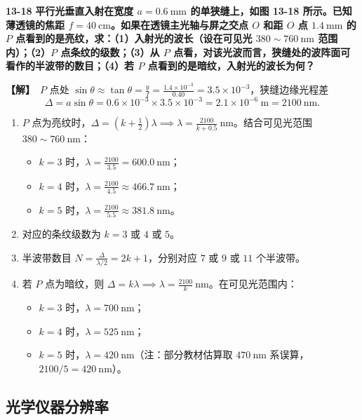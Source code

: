 \documentclass[zihao=5,a4paper,UTF8]{ctexart}
\newenvironment{prob}[2]{%
    \par\vspace{6pt}\noindent\textbf{\color{navy}#1} \textbf{#2}\par\nopagebreak\vspace{2pt}%
}{%
    \par\vspace{4pt}%
}
\newcommand{\sol}{\noindent\textbf{\color{tealaccent}【解】}\ }
\begin{document}
\begin{prob}{13-18}{平行光垂直入射在宽度 $a=0.6\ \mathrm{mm}$ 的单狭缝上，如图 13-18 所示。已知薄透镜的焦距 $f=40\ \mathrm{cm}$。如果在透镜主光轴与屏之交点 $O$ 和距 $O$ 点 $1.4\ \mathrm{mm}$ 的 $P$ 点看到的是亮纹，求：（1）入射光的波长（设在可见光 $380\sim 760\ \mathrm{nm}$ 范围内）；（2）$P$ 点条纹的级数；（3）从 $P$ 点看，对该光波而言，狭缝处的波阵面可看作的半波带的数目；（4）若 $P$ 点看到的是暗纹，入射光的波长为何？}
\sol $P$ 点处 $\sin\theta \approx \tan\theta = \frac{y}{f} = \frac{1.4\times 10^{-3}}{0.40} = 3.5\times 10^{-3}$，狭缝边缘光程差
\[
    \Delta = a\sin\theta = 0.6\times 10^{-3}\times 3.5\times 10^{-3} = 2.1\times 10^{-6}\ \mathrm{m} = 2100\ \mathrm{nm}.
\]
\begin{enumerate}[leftmargin=2em, itemsep=2pt]
    \item $P$ 点为亮纹时，$\Delta = \left(k + \frac{1}{2}\right)\lambda \implies \lambda = \frac{2100}{k + 0.5}\ \mathrm{nm}$。结合可见光范围 $380\sim 760\ \mathrm{nm}$：
    \begin{itemize}[leftmargin=1.5em]
        \item $k=3$ 时，$\lambda = \frac{2100}{3.5} = 600.0\ \mathrm{nm}$；
        \item $k=4$ 时，$\lambda = \frac{2100}{4.5} \approx 466.7\ \mathrm{nm}$；
        \item $k=5$ 时，$\lambda = \frac{2100}{5.5} \approx 381.8\ \mathrm{nm}$。
    \end{itemize}
    \item 对应的条纹级数为 $k = 3$ 或 $4$ 或 $5$。
    \item 半波带数目 $N = \frac{\Delta}{\lambda/2} = 2k + 1$，分别对应 $7$ 或 $9$ 或 $11$ 个半波带。
    \item 若 $P$ 点为暗纹，则 $\Delta = k\lambda \implies \lambda = \frac{2100}{k}\ \mathrm{nm}$。在可见光范围内：
    \begin{itemize}[leftmargin=1.5em]
        \item $k=3$ 时，$\lambda = 700\ \mathrm{nm}$；
        \item $k=4$ 时，$\lambda = 525\ \mathrm{nm}$；
        \item $k=5$ 时，$\lambda = 420\ \mathrm{nm}$（注：部分教材估算取 $470\ \mathrm{nm}$ 系误算，$2100/5=420\ \mathrm{nm}$）。
    \end{itemize}
\end{enumerate}
\end{prob}

\subsection{光学仪器分辨率}
\end{document}
